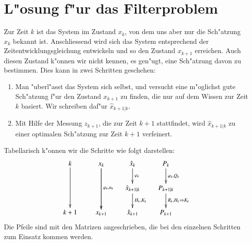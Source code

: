 \section{L"osung f"ur das Filterproblem}
Zur Zeit $k$ ist das System im Zustand $x_k$, von dem uns aber nur die
Sch"atzung $\hat x_k$ bekannt ist.
Anschliessend wird sich
das System entsprechend der Zeitentwicklungsgleichung entwickeln und
so den Zustand $x_{k+1}$ erreichen.
Auch diesen Zustand k"onnen wir nicht
kennen, es gen"ugt, eine Sch"atzung davon zu bestimmen.
Dies kann in zwei
Schritten geschehen:
\begin{enumerate}
\item Man "uberl"asst das System sich selbst, und versucht eine m"oglichst
gute Sch"atzung f"ur den Zustand $x_{k+1}$ zu finden, die nur auf dem
Wissen zur Zeit $k$ basiert.
Wir schreiben daf"ur $\hat x_{k+1|k}$.
\item Mit Hilfe der Messung $z_{k+1}$, die zur Zeit $k+1$ stattfindet, wird
$\hat x_{k+1|k}$ zu einer optimalen Sch"atzung zur Zeit $k+1$ verfeinert.
\end{enumerate}
Tabellarisch k"onnen wir die Schritte wie folgt darstellen:
\[
\xymatrix @-1mm {
k\ar[dd]&x_k\ar[dd]\ar[dd]^{\varphi_k, u_k} &\hat x_k\ar[d]^{\varphi_k}      &P_{k} \ar[d]^{\varphi_k,Q_k}    \\
        &           &\hat x_{k+1|k}\ar[d]^{H_k,K_k}&P_{k+1|k}\ar[d]^{R_k,H_k\Rightarrow K_k} \\
k+1     &x_{k+1}    &\hat x_{k+1}  &P_{k+1}
} \]
Die Pfeile sind mit den Matrizen angeschrieben, die bei den einzelnen Schritten zum
Einsatz kommen werden.

